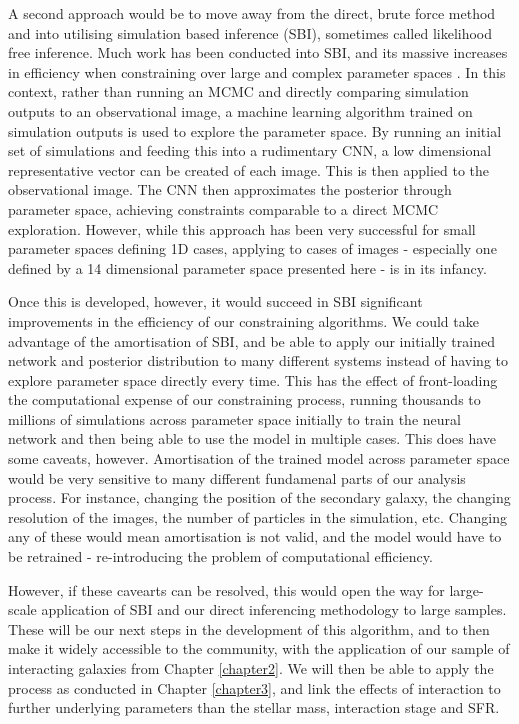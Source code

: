 A second approach would be to move away from the direct, brute force method and into utilising simulation based inference (SBI), sometimes called likelihood free inference. Much work has been conducted into SBI, and its massive increases in efficiency when constraining over large and complex parameter spaces \citep[for an excellent describtion of likelihood free inference, see][]{2021MNRAS.501..954J}. In this context, rather than running an MCMC and directly comparing simulation outputs to an observational image, a machine learning algorithm trained on simulation outputs is used to explore the parameter space. By running an initial set of simulations and feeding this into a rudimentary CNN, a low dimensional representative vector can be created of each image. This is then applied to the observational image. The CNN then approximates the posterior through parameter space, achieving constraints comparable to a direct MCMC exploration. However, while this approach has been very successful for small parameter spaces defining 1D cases, applying to cases of images - especially one defined by a 14 dimensional parameter space presented here - is in its infancy. 

Once this is developed, however, it would succeed in SBI significant improvements in the efficiency of our constraining algorithms. We could take advantage of the amortisation of SBI, and be able to apply our initially trained network and posterior distribution to many different systems instead of having to explore parameter space directly every time. This has the effect of front-loading the computational expense of our constraining process, running thousands to millions of simulations across parameter space initially to train the neural network and then being able to use the model in multiple cases. This does have some caveats, however. Amortisation of the trained model across parameter space would be very sensitive to many different fundamenal parts of our analysis process. For instance, changing the position of the secondary galaxy, the changing resolution of the images, the number of particles in the simulation, etc. Changing any of these would mean amortisation is not valid, and the model would have to be retrained - re-introducing the problem of computational efficiency. 

However, if these cavearts can be resolved, this would open the way for large-scale application of SBI and our direct inferencing methodology to large samples. These will be our next steps in the development of this algorithm, and to then make it widely accessible to the community, with the application of our sample of interacting galaxies from Chapter \ref{chapter2}. We will then be able to apply the process as conducted in Chapter \ref{chapter3}, and link the effects of interaction to further underlying parameters than the stellar mass, interaction stage and SFR. 